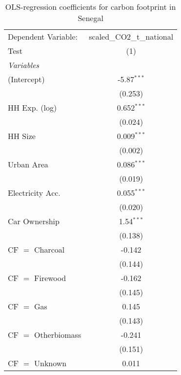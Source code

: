 
\begin{table}[htbp!]
   \centering
   \small
   \begin{adjustbox}{width = 1\textwidth, max height = 0.95\textheight, center}
      \begin{threeparttable}[b]
         \caption{\label{tab:OLS_2_SEN} OLS-regression coefficients for carbon footprint in Senegal}
         \begin{tabular}{lc}
            \tabularnewline \midrule \midrule
            Dependent Variable: & scaled\_CO2\_t\_national\\     
            Test                & (1)\\  
            \midrule
            \emph{Variables}\\
            (Intercept)         & -5.87$^{***}$\\   
                                & (0.253)\\   
            HH Exp. (log)       & 0.652$^{***}$\\   
                                & (0.024)\\   
            HH Size             & 0.009$^{***}$\\   
                                & (0.002)\\   
            Urban Area          & 0.086$^{***}$\\   
                                & (0.019)\\   
            Electricity Acc.    & 0.055$^{***}$\\   
                                & (0.020)\\   
            Car Ownership       & 1.54$^{***}$\\   
                                & (0.138)\\   
            CF $=$ Charcoal     & -0.142\\   
                                & (0.144)\\   
            CF $=$ Firewood     & -0.162\\   
                                & (0.145)\\   
            CF $=$ Gas          & 0.145\\   
                                & (0.143)\\   
            CF $=$ Otherbiomass & -0.241\\   
                                & (0.151)\\   
            CF $=$ Unknown      & 0.011\\   

\end{tabular}
\end{threeparttable}
\end{adjustbox}
\end{table}
